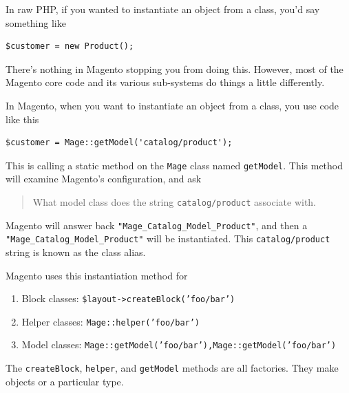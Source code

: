 \documentclass[oneside]{book}
\begin{document}
In raw PHP, if you wanted to instantiate an object from a class, you'd say something like

\begin{lstlisting}
$customer = new Product();

\end{lstlisting}


There's nothing in Magento stopping you from doing this.  However, most of the Magento core code and its various sub-systems do things a little differently.

In Magento, when you want to instantiate an object from a class, you use code like this

\begin{lstlisting}
$customer = Mage::getModel('catalog/product');

\end{lstlisting}


This is calling a static method on the \footnotesize\texttt{Mage} \normalsize  class named \footnotesize\texttt{getModel}\normalsize.  This method will examine Magento's configuration, and ask 

\begin{quote}
What model class does the string \footnotesize\texttt{catalog/product} \normalsize  associate with.
\end{quote}

Magento will answer back \footnotesize\texttt{"Mage\_Catalog\_Model\_Product"}\normalsize, and then a \footnotesize\texttt{"Mage\_Catalog\_Model\_Product"} \normalsize  will be instantiated. This \footnotesize\texttt{catalog/product} \normalsize  string is known as the class alias. 

Magento uses this instantiation method for 

\begin{enumerate}
\item Block classes:  \footnotesize\texttt{\$layout-\textgreater createBlock('foo/bar')} \normalsize 
\item Helper classes: \footnotesize\texttt{Mage::helper('foo/bar')} \normalsize 
\item Model classes: \footnotesize\texttt{Mage::getModel('foo/bar'),Mage::getModel('foo/bar')} \normalsize 
\end{enumerate}


The \footnotesize\texttt{createBlock}\normalsize, \footnotesize\texttt{helper}\normalsize, and \footnotesize\texttt{getModel} \normalsize  methods are all factories.  They make objects or a particular type.
\end{document}
